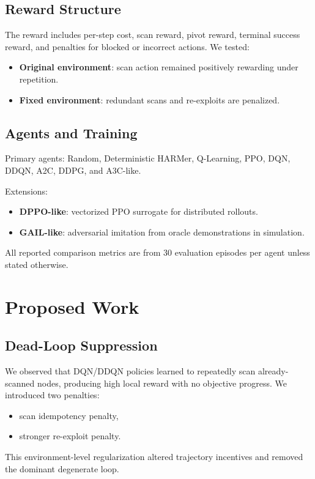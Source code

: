 \documentclass[conference]{IEEEtran}
\begin{document}
\subsection{Reward Structure}
The reward includes per-step cost, scan reward, pivot reward, terminal success reward, and penalties for blocked or incorrect actions. We tested:
\begin{itemize}
    \item \textbf{Original environment}: scan action remained positively rewarding under repetition.
    \item \textbf{Fixed environment}: redundant scans and re-exploits are penalized.
\end{itemize}

\subsection{Agents and Training}
Primary agents: Random, Deterministic HARMer, Q-Learning, PPO, DQN, DDQN, A2C, DDPG, and A3C-like.

Extensions:
\begin{itemize}
    \item \textbf{DPPO-like}: vectorized PPO surrogate for distributed rollouts.
    \item \textbf{GAIL-like}: adversarial imitation from oracle demonstrations in simulation.
\end{itemize}

All reported comparison metrics are from 30 evaluation episodes per agent unless stated otherwise.

\section{Proposed Work}
\subsection{Dead-Loop Suppression}
We observed that DQN/DDQN policies learned to repeatedly scan already-scanned nodes, producing high local reward with no objective progress. We introduced two penalties:
\begin{itemize}
    \item scan idempotency penalty,
    \item stronger re-exploit penalty.
\end{itemize}

This environment-level regularization altered trajectory incentives and removed the dominant degenerate loop.
\end{document}

